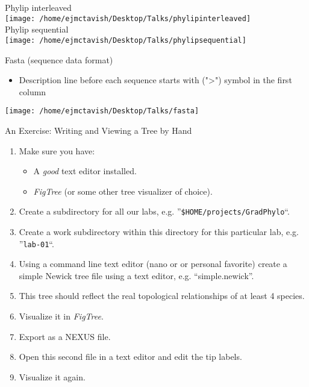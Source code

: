 \documentclass{beamer}
\begin{document}
\begin{frame}
Phylip interleaved\\
\texttt{[image: /home/ejmctavish/Desktop/Talks/phylipinterleaved]}\\
Phylip sequential\\
\texttt{[image: /home/ejmctavish/Desktop/Talks/phylipsequential]}
\end{frame}



\begin{frame}
Fasta (sequence data format)\\
\begin{itemize}
 \item Description line before each sequence starts with (">") symbol in the first column
\end{itemize}
\texttt{[image: /home/ejmctavish/Desktop/Talks/fasta]}
\end{frame}



\begin{frame}{An Exercise: Writing and Viewing a Tree by Hand}
    \begin{enumerate}
        \item   Make sure you have:
            \begin{itemize}
                \item   A \textit{good} text editor installed.
                \item   \textit{FigTree} (or some other tree visualizer of choice).
            \end{itemize}
        \item   Create a subdirectory for all our labs, e.g. ''\texttt{\$HOME/projects/GradPhylo}``.
        \item   Create a work subdirectory within this directory for this particular lab, e.g. ''\texttt{lab-01}``.
        \item   Using a command line text editor (nano or or personal favorite) create a simple Newick tree file using a text editor, e.g. ``simple.newick''.
        \item   This tree should reflect the real topological relationships of at least 4 species.
        \item   Visualize it in \textit{FigTree}.
        \item   Export as a NEXUS file.
        \item   Open this second file in a text editor and edit the tip labels.
        \item   Visualize it again.
    \end{enumerate}
\end{frame}
\end{document}
